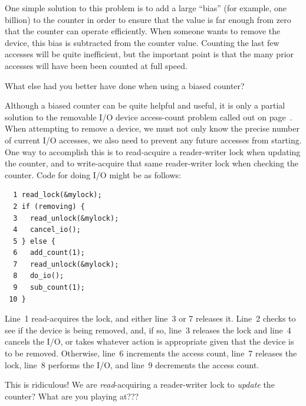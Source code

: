 One simple solution to this problem is to add a large ``bias''
(for example, one billion) to the
counter in order to ensure that the value is far enough from zero that
the counter can operate efficiently.
When someone wants to remove the device, this bias is subtracted from
the counter value.
Counting the last few accesses will be quite inefficient,
but the important point is that the many prior accesses will have been
been counted at full speed.

\QuickQuiz{}
	What else had you better have done when using a biased counter?
 \QuickQuizEnd

Although a biased counter can be quite helpful and useful, it is only a
partial solution to the removable I/O device access-count problem
called out on
page~\pageref{chp:Counting}.
When attempting to remove a device, we must not only know the precise
number of current I/O accesses, we also need to prevent any future
accesses from starting.
One way to accomplish this is to read-acquire a reader-writer lock
when updating the counter, and to write-acquire that same reader-writer
lock when checking the counter.
Code for doing I/O might be as follows:

\vspace{5pt}
\begin{minipage}[t]{\columnwidth}
\small
\begin{verbatim}
  1 read_lock(&mylock);
  2 if (removing) {
  3   read_unlock(&mylock);
  4   cancel_io();
  5 } else {
  6   add_count(1);
  7   read_unlock(&mylock);
  8   do_io();
  9   sub_count(1);
 10 }
\end{verbatim}
\end{minipage}
\vspace{5pt}

Line~1 read-acquires the lock, and either line~3 or 7 releases it.
Line~2 checks to see if the device is being removed, and, if so,
line~3 releases the lock and line~4 cancels the I/O, or takes whatever
action is appropriate given that the device is to be removed.
Otherwise, line~6 increments the access count, line~7 releases the
lock, line~8 performs the I/O, and line~9 decrements the access count.

\QuickQuiz{}
	This is ridiculous!
	We are \emph{read}-acquiring a reader-writer lock to
	\emph{update} the counter?
	What are you playing at???
 \QuickQuizEnd

